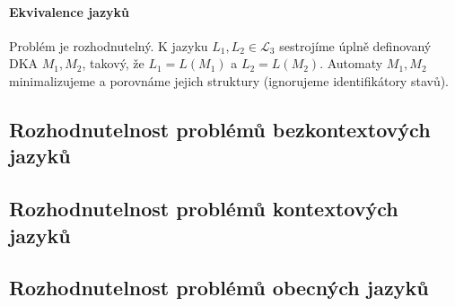 \paragraph*{Ekvivalence jazyků} Problém je rozhodnutelný. K jazyku $L_1, L_2 \in \mathcal{L}_3$ sestrojíme úplně definovaný DKA $M_1, M_2$, takový, že $L_1 = L(M_1)$ a $L_2 = L(M_2)$. Automaty $M_1, M_2$ minimalizujeme a porovnáme jejich struktury (ignorujeme identifikátory stavů).

\subsection{Rozhodnutelnost problémů bezkontextových jazyků}


\subsection{Rozhodnutelnost problémů kontextových jazyků}


\subsection{Rozhodnutelnost problémů obecných jazyků}

